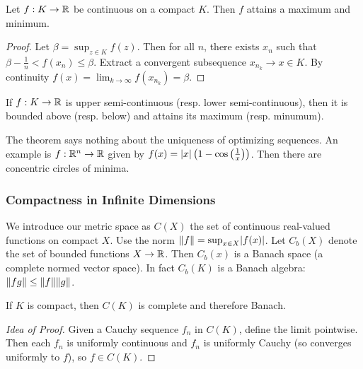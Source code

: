 \documentclass[10pt, twoside]{article}
\begin{document}
    \begin{thm} Let $f: K \rightarrow \mathbb{R}$ be continuous on a compact $K$. Then
        $f$ attains a maximum and minimum.  \begin{proof} Let $\beta = \sup_{z
            \in K} f(z)$. Then for all $n$, there exists $x_n$ such that $\beta
            - \frac{1}{n} < f(x_n) \leq \beta$. Extract a convergent
            subsequence $x_{n_k} \rightarrow x \in K$. By continuity $f(x) =
            \lim_{k \rightarrow \infty} f(x_{n_k}) = \beta$.  \end{proof}
        \end{thm}

    \begin{cor} If $f : K \rightarrow \mathbb{R}$ is upper semi-continuous (resp. lower
    semi-continuous), then it is bounded above (resp. below) and attains its
maximum (resp. minumum).  \end{cor}

    \begin{rmk} The theorem says nothing about the uniqueness of optimizing
        sequences. An example is $f: \mathbb{R}^n \rightarrow \mathbb{R}$ given by $f(x) =
        \lvert x\rvert\left(1-\cos\left(\frac{1}{x}\right)\right)$. Then there are
        concentric circles of minima.  \end{rmk}

    \subsubsection{Compactness in Infinite Dimensions} We introduce our metric
    space as $C(X)$ the set of continuous real-valued functions on compact $X$.
    Use the norm $\lVert f\rVert = \sup_{x \in X}\lvert f(x)\rvert$. Let $C_b(X)$ denote the
    set of bounded functions $X \rightarrow \mathbb{R}$. Then $C_b(x)$ is a Banach
    space (a complete normed vector space). In fact $C_b(K)$ is a Banach
    algebra: $\lVert fg\rVert \leq \lVert f\rVert \lVert g\rVert$.

    \begin{thm} If $K$ is compact, then $C(K)$ is complete and therefore
    Banach.  \end{thm}

    \begin{proof}[Idea of Proof] Given a Cauchy sequence $f_n$ in $C(K)$,
    define the limit pointwise. Then each $f_n$ is uniformly continuous and
$f_n$ is uniformly Cauchy (so converges uniformly to $f$), so $f \in C(K)$.
\end{proof}
\end{document}
